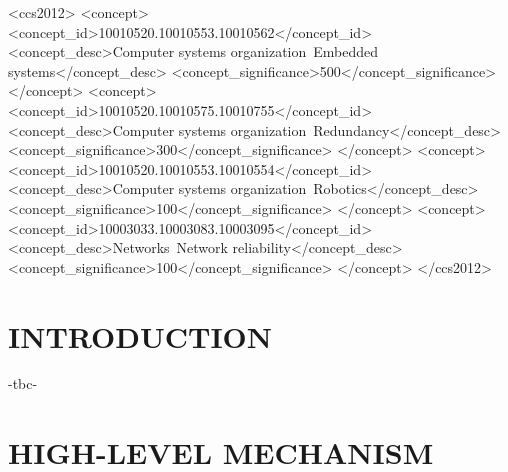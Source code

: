 \documentclass[sigconf]{acmart}
\begin{document}
%
%
\begin{CCSXML}
<ccs2012>
 <concept>
  <concept_id>10010520.10010553.10010562</concept_id>
  <concept_desc>Computer systems organization~Embedded systems</concept_desc>
  <concept_significance>500</concept_significance>
 </concept>
 <concept>
  <concept_id>10010520.10010575.10010755</concept_id>
  <concept_desc>Computer systems organization~Redundancy</concept_desc>
  <concept_significance>300</concept_significance>
 </concept>
 <concept>
  <concept_id>10010520.10010553.10010554</concept_id>
  <concept_desc>Computer systems organization~Robotics</concept_desc>
  <concept_significance>100</concept_significance>
 </concept>
 <concept>
  <concept_id>10003033.10003083.10003095</concept_id>
  <concept_desc>Networks~Network reliability</concept_desc>
  <concept_significance>100</concept_significance>
 </concept>
</ccs2012>  
\end{CCSXML}





\maketitle

\thispagestyle{plain}

\section{INTRODUCTION}
-tbc-

\section{HIGH-LEVEL MECHANISM}


\end{document}
